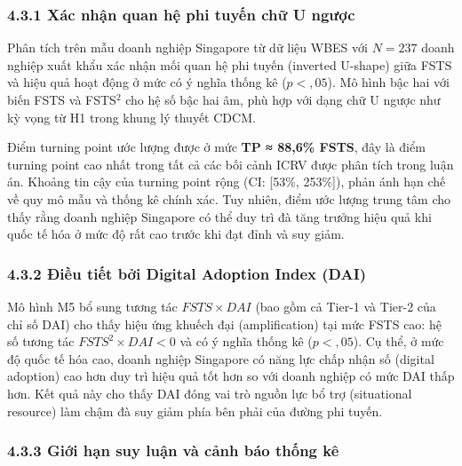 \documentclass[12pt,a4paper]{article}
\begin{document}
\hypertarget{431-xuxe1c-nhux1eadn-quan-hux1ec7-phi-tuyux1ebfn-chux1eef-u-ngux1b0ux1ee3c}{%
\subsubsection{4.3.1 Xác nhận quan hệ phi tuyến chữ U
ngược}\label{431-xuxe1c-nhux1eadn-quan-hux1ec7-phi-tuyux1ebfn-chux1eef-u-ngux1b0ux1ee3c}}

Phân tích trên mẫu doanh nghiệp Singapore từ dữ liệu WBES với
\(N = 237\) doanh nghiệp xuất khẩu xác nhận mối quan hệ phi tuyến
(inverted U-shape) giữa FSTS và hiệu quả hoạt động ở mức có ý nghĩa
thống kê (\(p < {,}05\)). Mô hình bậc hai với biến FSTS và FSTS\(^2\)
cho hệ số bậc hai âm, phù hợp với dạng chữ U ngược như kỳ vọng từ H1
trong khung lý thuyết CDCM.

Điểm turning point ước lượng được ở mức \textbf{TP ≈ 88,6\% FSTS}, đây
là điểm turning point cao nhất trong tất cả các bối cảnh ICRV được phân
tích trong luận án. Khoảng tin cậy của turning point rộng (CI: {[}53\%,
253\%{]}), phản ánh hạn chế về quy mô mẫu và thống kê chính xác. Tuy
nhiên, điểm ước lượng trung tâm cho thấy rằng doanh nghiệp Singapore có
thể duy trì đà tăng trưởng hiệu quả khi quốc tế hóa ở mức độ rất cao
trước khi đạt đỉnh và suy giảm.

\hypertarget{432-ux111iux1ec1u-tiux1ebft-bux1edfi-digital-adoption-index-dai}{%
\subsubsection{4.3.2 Điều tiết bởi Digital Adoption Index
(DAI)}\label{432-ux111iux1ec1u-tiux1ebft-bux1edfi-digital-adoption-index-dai}}

Mô hình M5 bổ sung tương tác \(FSTS \times DAI\) (bao gồm cả Tier-1 và
Tier-2 của chỉ số DAI) cho thấy hiệu ứng khuếch đại (amplification) tại
mức FSTS cao: hệ số tương tác \(FSTS^2 \times DAI < 0\) và có ý nghĩa
thống kê (\(p < {,}05\)). Cụ thể, ở mức độ quốc tế hóa cao, doanh nghiệp
Singapore có năng lực chấp nhận số (digital adoption) cao hơn duy trì
hiệu quả tốt hơn so với doanh nghiệp có mức DAI thấp hơn. Kết quả này
cho thấy DAI đóng vai trò nguồn lực bổ trợ (situational resource) làm
chậm đà suy giảm phía bên phải của đường phi tuyến.

\hypertarget{433-giux1edbi-hux1ea1n-suy-luux1eadn-vuxe0-cux1ea3nh-buxe1o-thux1ed1ng-kuxea}{%
\subsubsection{4.3.3 Giới hạn suy luận và cảnh báo thống
kê}\label{433-giux1edbi-hux1ea1n-suy-luux1eadn-vuxe0-cux1ea3nh-buxe1o-thux1ed1ng-kuxea}}
\end{document}
